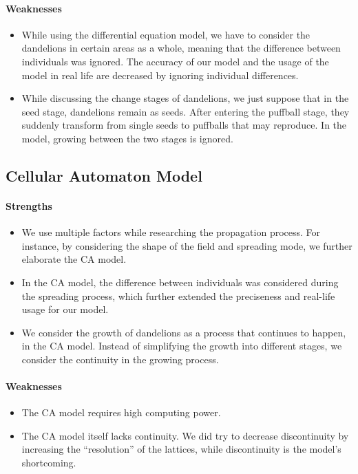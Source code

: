 \documentclass[12pt]{article}
\begin{document}
\paragraph{Weaknesses}
\begin{itemize}
\item While using the differential equation model, we have to consider the dandelions in certain areas as a whole, meaning that the difference between individuals was ignored. The accuracy of our model and the usage of the model in real life are decreased by ignoring individual differences.
\item While discussing the change stages of dandelions, we just suppose that in the seed stage, dandelions remain as seeds. After entering the puffball stage, they suddenly transform from single seeds to puffballs that may reproduce. In the model, growing between the two stages is ignored.
\end{itemize}

\subsection{Cellular Automaton Model}
\paragraph{Strengths}
\begin{itemize}
\item We use multiple factors while researching the propagation process. For instance, by considering the shape of the field and spreading mode, we further elaborate the CA model.
\item In the CA model, the difference between individuals was considered during the spreading process, which further extended the preciseness and real-life usage for our model.
\item We consider the growth of dandelions as a process that continues to happen, in the CA model. Instead of simplifying the growth into different stages, we consider the continuity in the growing process. 
\end{itemize}

\paragraph{Weaknesses}
\begin{itemize}
\item The CA model requires high computing power. 
\item The CA model itself lacks continuity. We did try to decrease discontinuity by increasing the “resolution” of the lattices, while discontinuity is the model's shortcoming.
\end{itemize}
\end{document}
